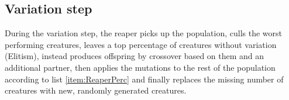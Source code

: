 \documentclass[main]{subfiles}
\begin{document}
\subsection{Variation step}

During the variation step, the reaper picks up the population, culls the worst performing creatures, leaves a top percentage of creatures without variation (Elitism), instead produces offspring by crossover based on them and an additional partner, then applies the mutations to the rest of the population according to list \ref{item:ReaperPerc} and finally replaces the missing number of creatures with new, randomly generated creatures.
\end{document}
